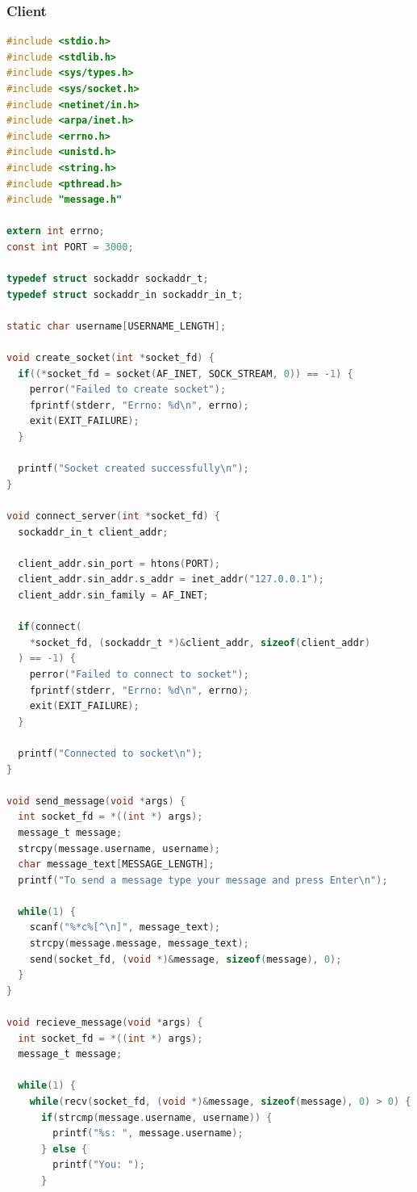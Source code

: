 \subsubsection{Client}
\begin{lstlisting}[language=C]
#include <stdio.h>
#include <stdlib.h>
#include <sys/types.h>
#include <sys/socket.h>
#include <netinet/in.h>
#include <arpa/inet.h>
#include <errno.h>
#include <unistd.h>
#include <string.h>
#include <pthread.h>
#include "message.h"

extern int errno;
const int PORT = 3000;

typedef struct sockaddr sockaddr_t;
typedef struct sockaddr_in sockaddr_in_t;

static char username[USERNAME_LENGTH]; 

void create_socket(int *socket_fd) {
  if((*socket_fd = socket(AF_INET, SOCK_STREAM, 0)) == -1) {
    perror("Failed to create socket");
    fprintf(stderr, "Errno: %d\n", errno);
    exit(EXIT_FAILURE);
  }

  printf("Socket created successfully\n");
}

void connect_server(int *socket_fd) {
  sockaddr_in_t client_addr;

  client_addr.sin_port = htons(PORT);
  client_addr.sin_addr.s_addr = inet_addr("127.0.0.1");
  client_addr.sin_family = AF_INET;

  if(connect(
    *socket_fd, (sockaddr_t *)&client_addr, sizeof(client_addr)
  ) == -1) {
    perror("Failed to connect to socket");
    fprintf(stderr, "Errno: %d\n", errno);
    exit(EXIT_FAILURE);
  }

  printf("Connected to socket\n");
}

void send_message(void *args) {
  int socket_fd = *((int *) args);
  message_t message;
  strcpy(message.username, username);
  char message_text[MESSAGE_LENGTH];
  printf("To send a message type your message and press Enter\n");

  while(1) {
    scanf("%*c%[^\n]", message_text);
    strcpy(message.message, message_text);
    send(socket_fd, (void *)&message, sizeof(message), 0);
  }
}

void recieve_message(void *args) {
  int socket_fd = *((int *) args);
  message_t message;

  while(1) {
    while(recv(socket_fd, (void *)&message, sizeof(message), 0) > 0) {
      if(strcmp(message.username, username)) {
        printf("%s: ", message.username);
      } else {
        printf("You: ");
      }


\end{lstlisting}
